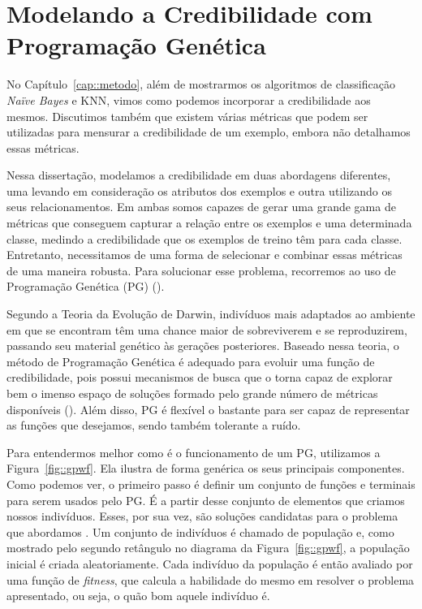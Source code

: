 
\chapter{Modelando a Credibilidade com Programação Genética}
\label{cap::programacao_genetica}

No Capítulo~\ref{cap::metodo},
além de mostrarmos os algoritmos de classificação \textit{Naïve Bayes} e \textsc{KNN}, vimos como podemos incorporar a credibilidade aos mesmos.
Discutimos também que existem várias métricas que podem ser utilizadas para mensurar a credibilidade de um exemplo, 
embora não detalhamos essas métricas.

Nessa dissertação, modelamos a credibilidade em duas abordagens diferentes, uma levando em consideração os atributos dos exemplos e outra utilizando os seus relacionamentos. 
Em ambas somos capazes de gerar uma grande gama de métricas que conseguem capturar a relação entre os exemplos e uma determinada classe, medindo a credibilidade que os exemplos de treino têm para cada classe.
Entretanto, necessitamos de uma forma de selecionar e combinar essas métricas de uma maneira robusta. Para solucionar esse problema, recorremos ao uso de Programação Genética (\textsc{PG}) (\cite{Koza92}).

Segundo a Teoria da Evolução de Darwin, indivíduos mais adaptados ao ambiente em que se encontram têm uma chance maior de sobreviverem e se reproduzirem, passando seu material genético às gerações posteriores. Baseado nessa teoria, o método de Programação Genética é adequado para evoluir uma função de credibilidade, pois possui mecanismos de busca que o torna capaz de explorar bem o imenso espaço de soluções formado pelo grande número de métricas disponíveis (\cite{Fogel00}). Além disso, \textsc{PG} é flexível o bastante para ser capaz de representar as funções que desejamos, sendo também tolerante a ruído.

Para entendermos melhor como é o funcionamento de um \textsc{PG}, utilizamos a Figura~\ref{fig::gpwf}. Ela ilustra de forma genérica os seus principais componentes.
Como podemos ver, o primeiro passo é definir um conjunto de funções e terminais para serem usados pelo \textsc{PG}.
É a partir desse conjunto de elementos que criamos nossos indivíduos.
Esses, por sua vez, são soluções candidatas para o problema que abordamos
.
Um conjunto de indivíduos é chamado de população e, como mostrado pelo segundo retângulo no diagrama da Figura~\ref{fig::gpwf}, a população inicial é criada aleatoriamente. 
Cada indivíduo da população é então avaliado por uma função de \textit{fitness}, que calcula a habilidade do mesmo em resolver o problema apresentado, ou seja, o quão bom aquele indivíduo é.

